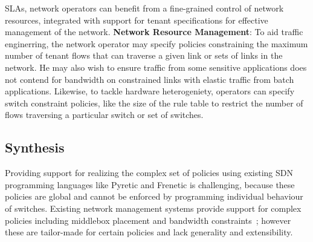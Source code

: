 SLAs, network operators can benefit from a fine-grained
control of network resources, integrated with support for tenant specifications 
for effective management of the network. \newline
\textbf{Network Resource Management}: To aid traffic
  enginerring, the network operator may specify policies constraining
  the maximum number of tenant flows that can traverse a given link or
  sets of links in the network. He may also wish to ensure traffic
  from some sensitive applications does not contend for bandwidth on
  constrained links with elastic traffic from batch applications.
  Likewise, to tackle hardware heterogeniety, operators can specify
  switch constraint policies, like the size of the rule table to
  restrict the number of flows traversing a particular switch or set
  of switches.

\subsection{Synthesis} \label{sec:synthesis} 

Providing support for realizing the complex set of policies using
existing SDN programming languages like Pyretic and Frenetic is
challenging, because these policies are global and cannot be enforced
by programming individual behaviour of switches. Existing network
management systems provide support for complex policies including
middlebox placement and bandwidth constraints~\cite{}; however these
are tailor-made for certain policies and lack generality and
extensibility.

